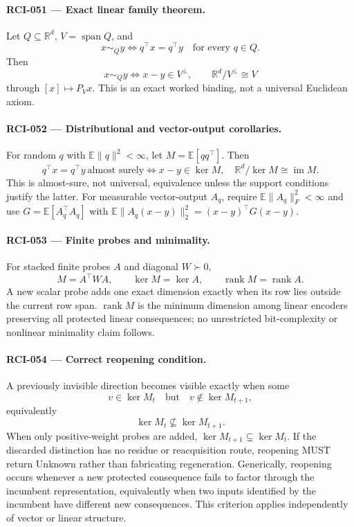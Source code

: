 \documentclass[11pt]{article}
\begin{document}
\paragraph{RCI-051 --- Exact linear family theorem.}
Let \(Q\subseteq\mathbb R^d\), \(V=\operatorname{span}Q\), and
\[
 x\sim_Qy \iff q^\top x=q^\top y\quad\text{for every }q\in Q.
\]
Then
\[
 x\sim_Qy \iff x-y\in V^\perp,\qquad
 \mathbb R^d/V^\perp\cong V
\]
through \([x]\mapsto P_Vx\). This is an exact worked binding, not a universal
Euclidean axiom.

\paragraph{RCI-052 --- Distributional and vector-output corollaries.}
For random \(q\) with \(\mathbb E\|q\|^2<\infty\), let
\(M=\mathbb E[qq^\top]\). Then
\[
 q^\top x=q^\top y\ \text{almost surely}
 \iff x-y\in\ker M,
\quad
 \mathbb R^d/\ker M\cong\operatorname{im}M.
\]
This is almost-sure, not universal, equivalence unless the support conditions
justify the latter. For measurable vector-output \(A_q\), require
\(\mathbb E\|A_q\|_F^2<\infty\) and use
\(G=\mathbb E[A_q^\top A_q]\) with
\(\mathbb E\|A_q(x-y)\|_2^2=(x-y)^\top G(x-y)\).

\paragraph{RCI-053 --- Finite probes and minimality.}
For stacked finite probes \(A\) and diagonal \(W\succ0\),
\[
 M=A^\top W A,\qquad \ker M=\ker A,\qquad
 \operatorname{rank}M=\operatorname{rank}A.
\]
A new scalar probe adds one exact dimension exactly when its row lies outside
the current row span. \(\operatorname{rank}M\) is the minimum dimension among
linear encoders preserving all protected linear consequences; no unrestricted
bit-complexity or nonlinear minimality claim follows.

\paragraph{RCI-054 --- Correct reopening condition.}
A previously invisible direction becomes visible exactly when some
\[
 v\in\ker M_t\quad\text{but}\quad v\notin\ker M_{t+1},
\]
equivalently
\[
 \boxed{\ker M_t\not\subseteq\ker M_{t+1}}.
\]
When only positive-weight probes are added,
\(\ker M_{t+1}\subsetneq\ker M_t\). If the discarded distinction has no
residue or reacquisition route, reopening MUST return Unknown rather than
fabricating regeneration.
Generically, reopening occurs whenever a new protected consequence fails to
factor through the incumbent representation, equivalently when two inputs
identified by the incumbent have different new consequences. This criterion
applies independently of vector or linear structure.
\end{document}
